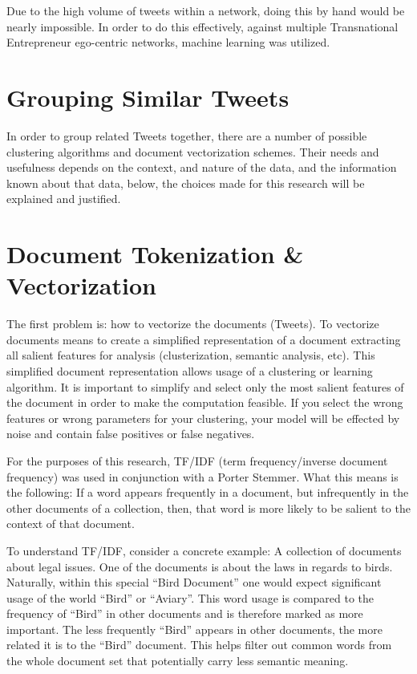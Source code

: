 Due to the high volume of tweets within a network, doing this by hand
would be nearly impossible. In order to do this effectively, against
multiple Transnational Entrepreneur ego-centric networks, machine
learning was utilized.

\section{Grouping Similar Tweets}
In order to group related Tweets together, there are a number of
possible clustering algorithms and document vectorization
schemes. Their needs and usefulness depends on the context, and nature
of the data, and the information known about that data, below, the
choices made for this research will be explained and justified.

\section{Document Tokenization \& Vectorization}
The first problem is: how to vectorize the documents (Tweets). To
vectorize documents means to create a simplified representation of a
document extracting all salient features for analysis (clusterization,
semantic analysis, etc). This simplified document representation
allows usage of a clustering or learning algorithm. It is important to
simplify and select only the most salient features of the document in
order to make the computation feasible. If you select the wrong
features or wrong parameters for your clustering, your model will be
effected by noise and contain false positives or false negatives.

For the purposes of this research, TF/IDF (term frequency/inverse
document frequency) was used in conjunction with a Porter
Stemmer. What this means is the following: If a word appears
frequently in a document, but infrequently in the other documents of a
collection, then, that word is more likely to be salient to the
context of that document.

To understand TF/IDF, consider a concrete example: A collection of
documents about legal issues. One of the documents is about the laws
in regards to birds. Naturally, within this special ``Bird Document''
one would expect significant usage of the world ``Bird'' or
``Aviary''. This word usage is compared to the frequency of ``Bird''
in other documents and is therefore marked as more important. The less
frequently ``Bird'' appears in other documents, the more related it is
to the ``Bird'' document. This helps filter out common words from the
whole document set that potentially carry less semantic meaning.

